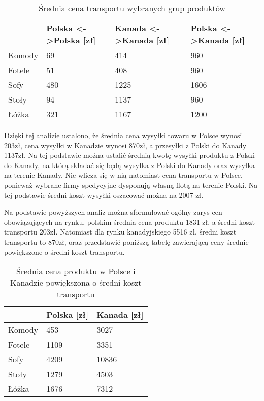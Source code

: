 \documentclass[
12pt, %
a4paper
]{report}
\begin{document}
		\begin{table}[H]
		\centering
		\begin{tabular}{|l|l|l|l|}
		\hline
					& Polska \textless-\textgreater Polska [zł] & Kanada \textless-\textgreater Kanada [zł] & Polska \textless-\textgreater Kanada [zł] \\ \hline
		Komody 	& 69                                 & 414                                & 960                                \\ \hline
		Fotele 	& 51                                 & 408                                & 960                                \\ \hline
		Sofy   	& 480                                & 1225                               & 1606                               \\ \hline
		Stoły  	& 94                                 & 1137                               & 960                                \\ \hline
		Łóżka  	& 321                               	& 1167                               & 1200                               \\ \hline
		\end{tabular}
		\caption{Średnia cena transportu wybranych grup produktów}
		\label{avg_grp_shp_price}
		\end{table}
		
		Dzięki tej analizie ustalono, że średnia cena wysyłki towaru w Polsce wynosi 203zł, cena wysyłki w Kanadzie wynosi 870zł, a przesyłki z Polski do Kanady 1137zł. Na tej podstawie można ustalić średnią kwotę wysyłki produktu z Polski do Kanady, na którą składać się będą wysyłka z Polski do Kanady oraz wysyłka na terenie Kanady. Nie wlicza się w nią natomiast cena transportu w Polsce, ponieważ wybrane firmy spedycyjne dysponują własną flotą na terenie Polski. Na tej podstawie średni koszt wysyłki oszacować można na 2007 zł.
		
		Na podstawie powyższych analiz można sformułować ogólny zarys cen obowiązujących na rynku, polskim średnia cena produktu 1831 zł, a średni koszt transportu 203zł. Natomiast dla rynku kanadyjskiego 5516 zł, średni koszt transportu to 870zł, oraz przedstawić poniższą tabelę zawierającą ceny średnie powiększone o średni koszt transportu.
		
		\begin{table}[H]
		\centering
		\begin{tabular}{|l|l|l|}
		\hline
					& Polska [zł]& Kanada [zł]\\ \hline
		Komody 	& 453  & 3027 \\ \hline
		Fotele 	& 1109 & 3351 \\ \hline
		Sofy   	& 4209 & 10836 \\ \hline
		Stoły  	& 1279 & 4503 \\ \hline
		Łóżka  	& 1676 & 7312 \\ \hline
		\end{tabular}
		\caption{Średnia cena produktu w Polsce i Kanadzie powiększona o średni koszt transportu}
		\label{avg_price_pl_ca}
		\end{table}
\end{document}

